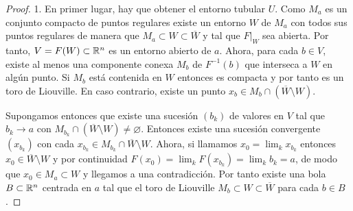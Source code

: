 \begin{proof}\leavevmode

  1. En primer lugar, hay que obtener el entorno tubular $U$. Como $M_a$ es un conjunto compacto de puntos regulares existe un entorno $W$ de $M_a$ con todos sus puntos regulares de manera que $M_a\subset W \subset \overline{W}$ y tal que $F|_W$ sea abierta. Por tanto, $V=F(W)\subset \mathbb{R}^n$ es un entorno abierto de $a$. Ahora, para cada $b\in V$, existe al menos una componente conexa $M_b$ de $F^{-1}(b)$ que interseca a $W$ en algún punto. Si $M_b$ está contenida en $W$ entonces es compacta y por tanto es un toro de Liouville. En caso contrario, existe un punto $x_b\in M_{b}\cap (\overline{W}\setminus W)$.
  
  Supongamos entonces que existe una sucesión $(b_k)$ de valores en $V$ tal que $b_k\rightarrow a$ con $M_{b_k}\cap(\overline{W}\setminus W) \neq \varnothing$. Entonces existe una sucesión convergente $(x_{b_k})$ con cada $x_{b_k}\in M_{b_k}\cap \overline{W}\setminus W$. Ahora, si llamamos $x_0=\lim_k x_{b_k}$ entonces $x_0\in \overline{W}\setminus W$ y por continuidad $F(x_0)=\lim_k F(x_{b_k})=\lim_k b_k =a$, de modo que $x_0 \in M_a\subset W$ y llegamos a una contradicción. Por tanto existe una bola $B\subset \mathbb{R}^n$ centrada en $a$ tal que el toro de Liouville $M_b\subset W \subset \overline{W}$ para cada $b\in B$. 
  

\end{proof}
